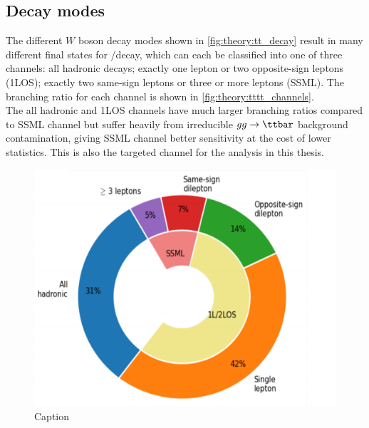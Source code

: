 \documentclass[../thesis.tex]{subfiles}
\begin{document}
\subsection*{Decay modes}
The different $W$ boson decay modes shown in \autoref{fig:theory:tt_decay} result in many different final states for \ttX/\tttt decay, which can each be classified into one of three channels: all hadronic decays; exactly one lepton or two opposite-sign leptons (\acs{1LOS}); exactly two same-sign leptons or three or more leptons (\acs{SSML}). The branching ratio for each channel is shown in \autoref{fig:theory:tttt_channels}.\\
The all hadronic and \acs{1LOS} channels have much larger branching ratios compared to \acs{SSML} channel but suffer heavily from irreducible $gg\rightarrow\ttbar$ background contamination, giving \acs{SSML} channel better sensitivity at the cost of lower statistics. This is also the targeted channel for the analysis in this thesis.

\begin{figure}[!htbp]
\begin{center}
\includegraphics[width=0.7\linewidth]{fig/theory_tttt_channels.png}
\caption{\label{fig:theory:tttt_channels}Caption}
\end{center}
\end{figure}



\end{document}
